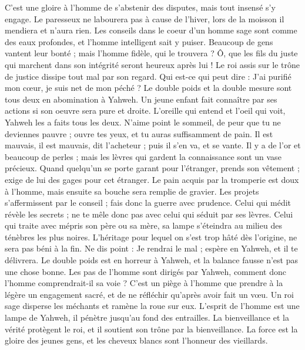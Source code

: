 \begin{multicols}{2}
C'est une gloire à l'homme de s'abstenir des disputes, mais tout insensé s'y engage.
Le paresseux ne labourera pas à cause de l’hiver, lors de la moisson il mendiera et n'aura rien.
Les conseils dans le coeur d'un homme sage sont comme des eaux profondes, et l'homme intelligent sait y puiser.
Beaucoup de gens vantent leur bonté ; mais l’homme fidèle, qui le trouvera ?
Ô, que les fils du juste qui marchent dans son intégrité seront heureux après lui !
Le roi assis sur le trône de justice dissipe tout mal par son regard.
Qui est-ce qui peut dire : J'ai purifié mon cœur, je suis net de mon péché ?
Le double poids et la double mesure sont tous deux en abomination à Yahweh.
Un jeune enfant fait connaître par ses actions si son oeuvre sera pure et droite.
L'oreille qui entend et l'oeil qui voit, Yahweh les a faits tous les deux.
N'aime point le sommeil, de peur que tu ne deviennes pauvre ; ouvre tes yeux, et tu auras suffisamment de pain.
Il est mauvais, il est mauvais, dit l’acheteur ; puis il s’en va, et se vante.
Il y a de l'or et beaucoup de perles ; mais les lèvres qui gardent la connaissance sont un vase précieux.
Quand quelqu'un se porte garant pour l'étranger, prends son vêtement ;  exige de lui des gages pour cet étranger.
Le pain acquis par la tromperie est doux à l'homme, mais ensuite sa bouche sera remplie de gravier.
Les projets s'affermissent par le conseil ; fais donc la guerre avec prudence.
Celui qui médit révèle les secrets ; ne te mêle donc pas avec celui qui séduit par ses lèvres.
Celui qui traite avec mépris son père ou sa mère, sa lampe s’éteindra au milieu des ténèbres les plus noires.
L'héritage pour lequel on s'est trop hâté dès l’origine, ne sera pas béni à la fin.
Ne dis point : Je rendrai le mal ; espère en Yahweh, et il te délivrera.
Le double poids est en horreur à Yahweh, et la balance fausse n'est pas une chose bonne.
Les pas de l'homme sont dirigés par Yahweh, comment donc l'homme comprendrait-il sa voie ?
C'est un piège à l'homme que prendre à la légère un engagement sacré, et de ne réfléchir qu’après avoir fait un vœu.
Un roi sage disperse les méchants et ramène la roue sur eux.
L'esprit de l'homme est une lampe de Yahweh, il pénètre jusqu’au fond des entrailles.
La bienveillance et la vérité protègent le roi, et il soutient son trône par la bienveillance.
La force est la gloire des jeunes gens, et les cheveux blancs sont l'honneur des vieillards.

\end{multicols}
